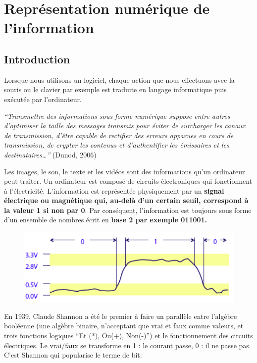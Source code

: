 \documentclass[11pt, a4paper]{book}
\begin{document}
\chapter{Représentation numérique de l’information}


\section{Introduction}

Lorsque nous utilisons un logiciel, chaque action que nous effectuons avec la souris ou le clavier par exemple est traduite en langage informatique puis exécutée par l’ordinateur. 

{\it “Transmettre des informations sous forme numérique suppose entre autres d'optimiser la taille des messages transmis pour éviter de surcharger les canaux de transmission, d'être capable de rectifier des erreurs apparues en cours de transmission, de crypter les contenus et d'authentifier les émissaires et les destinataires…” }(Dunod, 2006)

Les images, le son, le texte et les vidéos sont des informations qu’un ordinateur peut traiter. Un ordinateur est composé de circuits électroniques qui fonctionnent à l'électricité. L’information est représentée physiquement par un\textbf{ signal électrique ou magnétique qui, au-delà d'un certain seuil, correspond à la valeur 1 si non par 0}. Par conséquent, l’information est toujours sous forme d’un ensemble de nombres écrit en \textbf{base 2 par exemple 011001.}

\begin{figure}[h]
\begin{center}
\includegraphics[scale=.5]{images/electric_binary}
\end{center}
\end{figure}

En 1939, Claude Shannon a été le premier à faire un parallèle entre l'algèbre booléenne (une algèbre binaire, n'acceptant que vrai et faux comme valeurs, et trois fonctions logiques “Et (*), Ou(+), Non(-)”) et le fonctionnement des circuits électriques. Le vrai/faux se transforme en 1 : le courant passe, 0 : il ne passe pas. C'est Shannon qui popularise le terme de bit:
\end{document}
